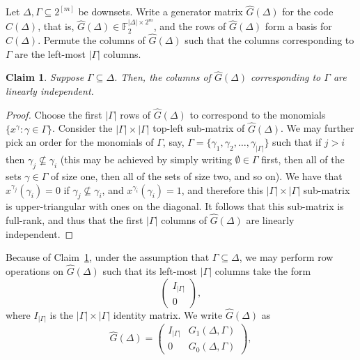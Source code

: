 \documentclass{article}
\newcounter{main}[section]
\newtheorem{claim}[main]{Claim}
\begin{document}
Let $\Delta, \Gamma \subseteq 2^{[m]}$ be downsets. Write a generator matrix $\hat{G}(\Delta)$ for the code $C(\Delta)$, that is, $\hat{G}(\Delta) \in \mathbb{F}_2^{|\Delta| \times 2^m}$, and the rows of $\hat{G}(\Delta)$ form a basis for $C(\Delta)$. Permute the columns of $\hat{G}(\Delta)$ such that the columns corresponding to $\Gamma$ are the left-most $|\Gamma|$ columns.
\begin{claim}\label{claim:column_rank}
    Suppose $\Gamma \subseteq \Delta$. Then, the columns of $\hat{G}(\Delta)$ corresponding to $\Gamma$ are linearly independent.
\end{claim}
\begin{proof}
    Choose the first $|\Gamma|$ rows of $\hat{G}(\Delta)$ to correspond to the monomials $\{x^\gamma: \gamma \in \Gamma\}$. Consider the $|\Gamma| \times |\Gamma|$ top-left sub-matrix of $\hat{G}(\Delta)$. We may further pick an order for the monomials of $\Gamma$, say, $\Gamma = \{\gamma_1, \gamma_2, \ldots, \gamma_{|\Gamma|}\}$ such that if $j > i$ then $\gamma_j \not \subseteq \gamma_i$ (this may be achieved by simply writing $\emptyset \in \Gamma$ first, then all of the sets $\gamma \in \Gamma$ of size one, then all of the sets of size two, and so on). We have that $x^{\gamma_j}(\gamma_i) = 0$ if $\gamma_j \not\subseteq \gamma_i$, and $x^{\gamma_i}(\gamma_i) = 1$, and therefore this $|\Gamma| \times |\Gamma|$ sub-matrix is upper-triangular with ones on the diagonal. It follows that this sub-matrix is full-rank, and thus that the first $|\Gamma|$ columns of $\hat{G}(\Delta)$ are linearly independent.
\end{proof}
Because of Claim~\ref{claim:column_rank}, under the assumption that $\Gamma \subseteq \Delta$, we may perform row operations on $\hat{G}(\Delta)$ such that its left-most $|\Gamma|$ columns take the form
\begin{equation}
    \begin{pmatrix}
        I_{|\Gamma|}\\
        0
    \end{pmatrix},
\end{equation}
where $I_{|\Gamma|}$ is the $|\Gamma| \times |\Gamma|$ identity matrix. We write $\hat{G}(\Delta)$ as
\begin{equation}
    \hat{G}(\Delta) = \begin{pmatrix}
        I_{|\Gamma|} & G_1(\Delta, \Gamma)\\
        0 & G_0(\Delta, \Gamma)
    \end{pmatrix},
\end{equation}
\end{document}
